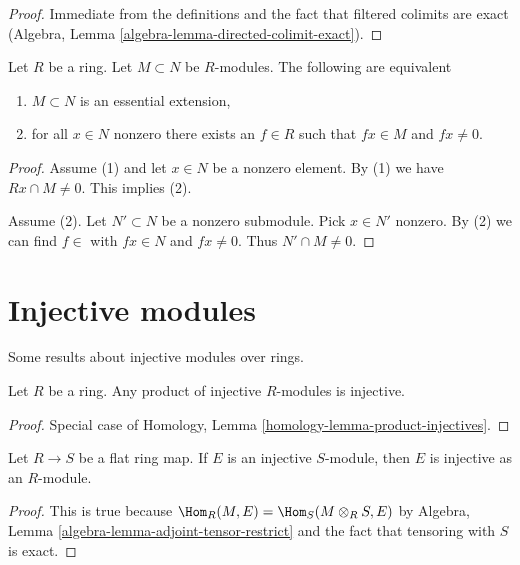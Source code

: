 \begin{proof}
Immediate from the definitions and the fact that filtered
colimits are exact (Algebra, Lemma \ref{algebra-lemma-directed-colimit-exact}).
\end{proof}

\begin{lemma}
\label{lemma-essential-extension}
Let $R$ be a ring. Let $M \subset N$ be $R$-modules. The following
are equivalent
\begin{enumerate}
\item $M \subset N$ is an essential extension,
\item for all $x \in N$ nonzero there exists an $f \in R$ such that $fx \in M$
and $fx \not = 0$.
\end{enumerate}
\end{lemma}

\begin{proof}
Assume (1) and let $x \in N$ be a nonzero element. By (1) we have
$Rx \cap M \not = 0$. This implies (2).

\medskip\noindent
Assume (2). Let $N' \subset N$ be a nonzero submodule. Pick $x \in N'$
nonzero. By (2) we can find $f \in $ with $fx \in N$ and $fx \not = 0$.
Thus $N' \cap M \not = 0$.
\end{proof}




\section{Injective modules}
\label{section-injective-modules}

\noindent
Some results about injective modules over rings.

\begin{lemma}
\label{lemma-product-injectives}
Let $R$ be a ring. Any product of injective $R$-modules is injective.
\end{lemma}

\begin{proof}
Special case of Homology, Lemma \ref{homology-lemma-product-injectives}.
\end{proof}

\begin{lemma}
\label{lemma-injective-flat}
Let $R \to S$ be a flat ring map. If $E$ is an injective $S$-module,
then $E$ is injective as an $R$-module.
\end{lemma}

\begin{proof}
This is true because $\Hom_R(M, E) = \Hom_S(M \otimes_R S, E)$
by Algebra, Lemma \ref{algebra-lemma-adjoint-tensor-restrict}
and the fact that tensoring with $S$ is exact.
\end{proof}

